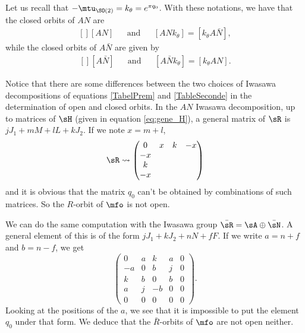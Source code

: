 Let us recall that $-\mtu_{\SO(2)}=k_{\theta}= e^{\pi q_0}$. With these notations, we have that the closed orbits of $AN$ are
\begin{equation}
	\begin{aligned}[]
		[AN]&&\text{and}&&[ANk_{\theta}]=[k_{\theta}A\bar N],
	\end{aligned}
\end{equation}
while the closed orbits of $A\bar N$ are given by
\begin{equation}
	\begin{aligned}[]
		[A\bar N]&&\text{and}&&[A\bar Nk_{\theta}]=[k_{\theta}AN].
	\end{aligned}
\end{equation}

Notice that there are some differences between the two choices of Iwasawa decompositions of equations \eqref{TabelPrem} and \eqref{TableSeconde} in the determination of open and closed orbits. In the $AN$ Iwasawa decomposition, up to matrices of $\sH$ (given in equation \eqref{eq:gene_H}), a general matrix of $\sR$ is $jJ_1+mM+lL+kJ_2$. If we note $x=m+l$,
\begin{equation} \label{eq:geneR}
\sR\leadsto
\begin{pmatrix}
0&x&k&-x\\
-x\\
k\\
-x
\end{pmatrix}
\end{equation}
and it is obvious that the matrix $q_0$ can't be obtained by combinations of such matrices. So the $R$-orbit of $\mfo$ is not open.

We can do the same computation with the Iwasawa group $\bar\sR=\sA\oplus\bar\sN$. A general element of this is of the form $jJ_1+kJ_2+nN+fF$. If we write $a=n+f$ and $b=n-f$, we get
\begin{equation}
	\begin{pmatrix}
 0	&	a	&	k	&	a	&	0\\ 
 -a	&	0	&	b	&	j	&	0\\ 
 k	&	b	&	0	&	b	&	0\\ 
 a	&	j	&	-b	&	0	&	0\\ 
0	&	0	&	0	&	0	&	0
 \end{pmatrix}.
\end{equation}
Looking at the positions of the $a$, we see that it is impossible to put the element $q_0$ under that form. We deduce that the $\bar R$-orbits of $\mfo$ are not open neither.

